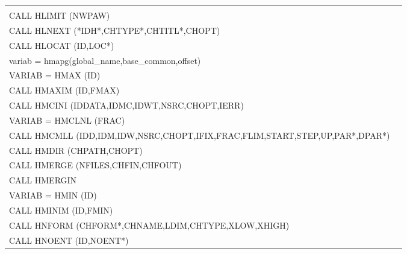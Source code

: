 \begin{longtable}{|>{\ttfamily\small}p{.9\linewidth}r|}
&                                                       \pageref{HLIMAP} \\
CALL     HLIMIT (NWPAW)                      
&                                                       \pageref{HLIMIT} \\
CALL     HLNEXT (*IDH*,CHTYPE*,CHTITL*,CHOPT)
&                                                       \pageref{HLNEXT} \\
CALL     HLOCAT (ID,LOC*)                    
&                                                       \pageref{HLOCAT} \\
variab = hmapg(global\_name,base\_common,offset)
&                                                        \pageref{hmapg} \\
VARIAB = HMAX   (ID)                         
&                                                       \pageref{HMAX}   \\
CALL     HMAXIM (ID,FMAX)                    
&                                                       \pageref{HMAXIM} \\
CALL     HMCINI (IDDATA,IDMC,IDWT,NSRC,CHOPT,IERR)
&                                                       \pageref{HMCINI} \\
VARIAB = HMCLNL (FRAC)
&                                                       \pageref{HMCLNL} \\
CALL     HMCMLL (IDD,IDM,IDW,NSRC,CHOPT,IFIX,FRAC,FLIM,START,STEP,UP,PAR*,DPAR*)
&                                                       \pageref{HMCMLL} \\
CALL     HMDIR  (CHPATH,CHOPT)               
&                                                       \pageref{HMDIR}  \\
CALL     HMERGE (NFILES,CHFIN,CHFOUT)
&                                                       \pageref{HMERGE} \\
CALL     HMERGIN 
&                                                       \pageref{HMERGIN}\\
VARIAB = HMIN   (ID)                         
&                                                       \pageref{HMIN}   \\
CALL     HMINIM (ID,FMIN)                    
&                                                       \pageref{HMINIM} \\
CALL     HNFORM (CHFORM*,CHNAME,LDIM,CHTYPE,XLOW,XHIGH)
&                                                       \pageref{HNFORM} \\
CALL     HNOENT (ID,NOENT*)                  
&                                                       \pageref{HNOENT} \\

\end{longtable}
